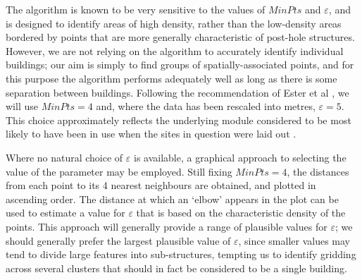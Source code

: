 \documentclass[../../ArchStats.tex]{subfiles}
\begin{document}
The algorithm is known to be very sensitive to the values of $MinPts$ and $\varepsilon$, and is designed to identify areas of high density, rather than the low-density areas bordered by points that are more generally characteristic of post-hole structures. However, we are not relying on the algorithm to accurately  identify individual buildings; our aim is simply to find groups of spatially-associated points, and for this purpose the algorithm performs adequately well as long as there is some separation between buildings. Following the recommendation of Ester et al \cite{Ester1996}, we will use $MinPts = 4$ and, where the data has been rescaled into metres, $\varepsilon = 5$. This choice approximately reflects the underlying module considered to be most likely to have been in use when the sites in question were laid out  \cite{Blair2013}. 

Where no natural choice of $\varepsilon$ is available, a graphical approach to selecting the value of the parameter may be employed. Still fixing $MinPts = 4$, the distances from each point to its 4 nearest neighbours are obtained, and plotted in ascending order. The distance at which an `elbow' appears in the plot can be used to estimate a value for $\varepsilon$ that is based on the characteristic density of the points. This approach will generally provide a range of plausible values for $\varepsilon$; we should generally prefer the largest plausible value of $\varepsilon$, since smaller values may tend to divide large features into sub-structures, tempting us to identify gridding across several clusters that should in fact be considered to be a single building.
\end{document}
